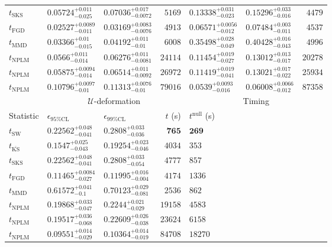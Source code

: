 \begin{tabular}{l|llr|llr}
	$t_{\mathrm{SKS}}$ & $0.05724_{-0.025}^{+0.011}$ & $0.07036_{-0.0072}^{+0.017}$ & $5169$ & $0.13338_{-0.023}^{+0.031}$ & $0.15296_{-0.016}^{+0.033}$ & $4479$ \\
	$t_{\mathrm{FGD}}$ & $0.02527_{-0.011}^{+0.0089}$ & $0.03169_{-0.0076}^{+0.0083}$ & $4913$ & ${\mathbf{0.06571_{-0.012}^{+0.0056}}}$ & ${\mathbf{0.07484_{-0.011}^{+0.003}}}$ & $4537$ \\
	$t_{\mathrm{MMD}}$ & $0.03366_{-0.015}^{+0.01}$ & $0.04192_{-0.01}^{+0.011}$ & $6008$ & $0.35498_{-0.049}^{+0.028}$ & $0.40428_{-0.043}^{+0.016}$ & $4996$ \\
\rowcolor{red!35}	$t_{\mathrm{NPLM}}$ & $0.0566_{-0.014}^{+0.011}$ & $0.06276_{-0.0081}^{+0.011}$ & $24114$ & $0.11454_{-0.027}^{+0.019}$ & $0.13012_{-0.017}^{+0.013}$ & $20278$ \\
\rowcolor{blue!35}	$t_{\mathrm{NPLM}}$ & $0.05875_{-0.014}^{+0.0094}$ & $0.06514_{-0.0092}^{+0.011}$ & $26972$ & $0.11419_{-0.041}^{+0.019}$ & $0.13021_{-0.022}^{+0.017}$ & $25934$ \\
\rowcolor{green!35}	$t_{\mathrm{NPLM}}$ & $0.10796_{-0.01}^{+0.0097}$ & $0.11313_{-0.01}^{+0.0076}$ & $79016$ & $0.0539_{-0.016}^{+0.0093}$ & $0.06008_{-0.012}^{+0.0066}$ & $87358$ \\
	\toprule
	\multicolumn{1}{c}{} & \multicolumn{3}{c}{$\mathcal{U}$-deformation} & \multicolumn{3}{c}{Timing} \\
Statistic & $\epsilon_{95\%\mathrm{CL}}$ & $\epsilon_{99\%\mathrm{CL}}$ & $t$ (s) & $t^{\mathrm{null}}$ (s) \\
	\midrule
	$t_{\mathrm{SW}}$ & $0.22562_{-0.041}^{+0.048}$ & $0.2808_{-0.036}^{+0.033}$ & ${\mathbf{765}}$ & ${\mathbf{269}}$ \\
	$t_{\overline{\mathrm{KS}}}$ & $0.1547_{-0.043}^{+0.025}$ & $0.19254_{-0.046}^{+0.023}$ & $4034$ & $353$ \\
	$t_{\mathrm{SKS}}$ & $0.22562_{-0.041}^{+0.048}$ & $0.2808_{-0.054}^{+0.033}$ & $4777$ & $857$ \\
	$t_{\mathrm{FGD}}$ & ${\mathbf{0.11465_{-0.027}^{+0.0084}}}$ & ${\mathbf{0.11995_{-0.004}^{+0.016}}}$ & $4174$ & $1336$ \\
	$t_{\mathrm{MMD}}$ & $0.61572_{-0.1}^{+0.041}$ & $0.70123_{-0.081}^{+0.029}$ & $2536$ & $862$ \\
\rowcolor{red!35}	$t_{\mathrm{NPLM}}$ & $0.19868_{-0.047}^{+0.033}$ & $0.2244_{-0.029}^{+0.021}$ & $19158$ & $4583$ \\
\rowcolor{blue!35}	$t_{\mathrm{NPLM}}$ & $0.19517_{-0.068}^{+0.036}$ & $0.22609_{-0.038}^{+0.026}$ & $23624$ & $6158$ \\
\rowcolor{green!35}	$t_{\mathrm{NPLM}}$ & $0.09551_{-0.029}^{+0.014}$ & $0.10364_{-0.019}^{+0.014}$ & $84708$ & $18270$ \\
	\bottomrule
\end{tabular}
